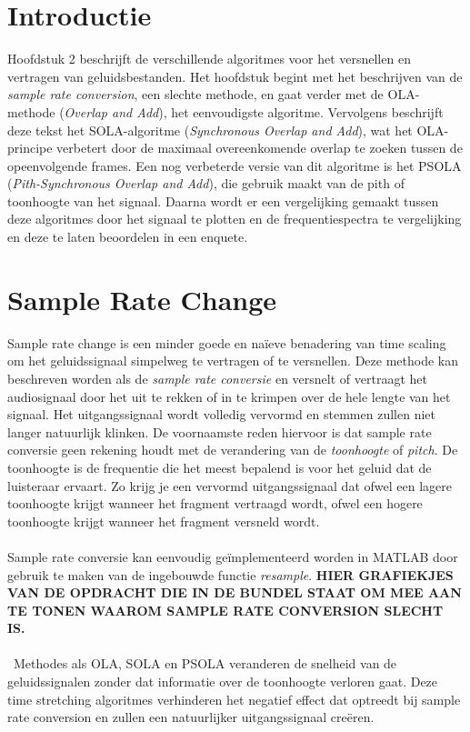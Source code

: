 \documentclass[12pt]{report}
\begin{document}
\section{Introductie}
Hoofdstuk 2 beschrijft de verschillende algoritmes voor het versnellen en vertragen van geluidsbestanden. Het hoofdstuk begint met het beschrijven van de \textit{sample rate conversion}, een slechte methode, en gaat verder met de OLA-methode (\textit{Overlap and Add}), het eenvoudigste algoritme. Vervolgens beschrijft deze tekst het SOLA-algoritme (\textit{Synchronous Overlap and Add}), wat het OLA-principe verbetert door de maximaal overeenkomende overlap te zoeken tussen de opeenvolgende frames. Een nog verbeterde versie van dit algoritme is het PSOLA (\textit{Pith-Synchronous Overlap and Add}), die gebruik maakt van de pith of toonhoogte van het signaal. Daarna wordt er een vergelijking gemaakt tussen deze algoritmes door het signaal te plotten en de frequentiespectra te vergelijking en deze te laten beoordelen in een enquete. 


\section{Sample Rate Change}
Sample rate change is een minder goede en na\"{i}eve benadering van time scaling om het geluidssignaal simpelweg te vertragen of te versnellen. Deze methode kan beschreven worden als de \textit{sample rate conversie} en versnelt of vertraagt het audiosignaal door het uit te rekken of in te krimpen over de hele lengte van het signaal. Het uitgangssignaal wordt volledig vervormd en stemmen zullen niet langer natuurlijk klinken. De voornaamste reden hiervoor is dat sample rate conversie geen rekening houdt met de verandering van de \textit{toonhoogte} of \textit{pitch}. De toonhoogte is de frequentie die het meest bepalend is voor het geluid dat de luisteraar ervaart. Zo krijg je een vervormd uitgangssignaal dat ofwel een lagere toonhoogte krijgt wanneer het fragment vertraagd wordt, ofwel een hogere toonhoogte krijgt wanneer het fragment versneld wordt.\\
\\
Sample rate conversie kan eenvoudig ge\"{i}mplementeerd worden in MATLAB door gebruik te maken van de ingebouwde functie \textit{resample}. \textbf{HIER GRAFIEKJES VAN DE OPDRACHT DIE IN DE BUNDEL STAAT OM MEE AAN TE TONEN WAAROM SAMPLE RATE CONVERSION SLECHT IS.} \\
\\\
Methodes als OLA, SOLA en PSOLA veranderen de snelheid van de geluidssignalen zonder dat informatie over de toonhoogte verloren gaat. Deze time stretching algoritmes verhinderen het negatief effect dat optreedt bij sample rate conversion en zullen een natuurlijker uitgangssignaal cre\"{e}ren.
\end{document}
